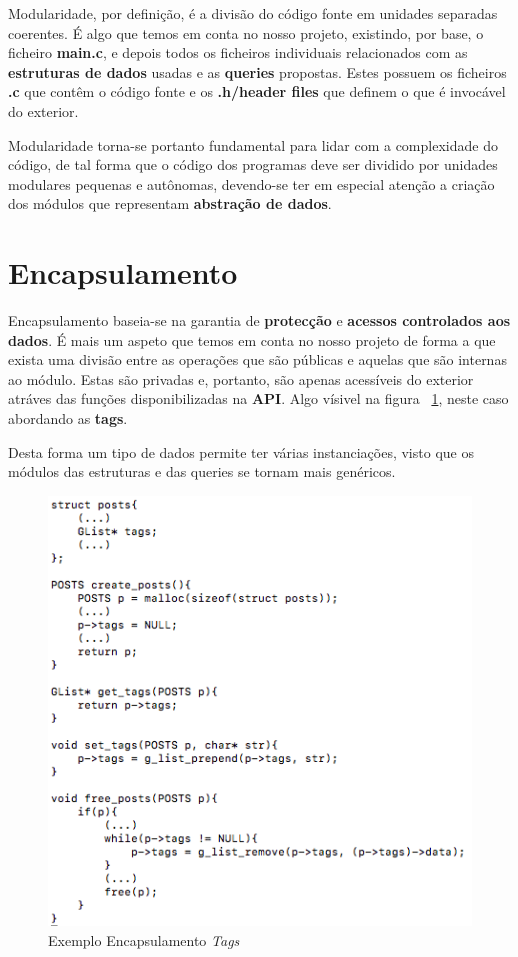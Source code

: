 \documentclass[a4paper]{article}
\begin{document}
Modularidade, por definição, é a divisão do código fonte em unidades 
separadas coerentes. É algo que temos em conta no nosso projeto,
existindo, por base, o ficheiro \textbf{main.c}, e depois todos os
ficheiros individuais relacionados com as \textbf{estruturas de dados}
usadas e as \textbf{queries} propostas. Estes possuem os ficheiros 
\textbf{.c} que contêm o código fonte e os \textbf{.h/header files} que
definem o que é invocável do exterior.

Modularidade torna-se portanto fundamental para lidar com a complexidade
do código, de tal forma que o código dos programas deve ser dividido por
unidades modulares pequenas e autônomas, devendo-se ter em especial atenção
a criação dos módulos que representam \textbf{abstração de dados}.

\section{Encapsulamento}
\label{sec:encapsulamento}

Encapsulamento baseia-se na garantia de \textbf{protecção} e 
\textbf{acessos controlados aos dados}. É mais um aspeto que temos em 
conta no nosso projeto de forma a que exista uma divisão entre as operações 
que são públicas e aquelas que são internas ao módulo. Estas são privadas e,
portanto, são apenas acessíveis do exterior atráves das funções
disponibilizadas na \textbf{API}. Algo vísivel na figura 
~\ref{img:encapsulamento_posts}, neste caso abordando as \textbf{tags}.

Desta forma um tipo de dados permite ter várias instanciações,
visto que os módulos das estruturas e das queries se tornam mais genéricos.

\begin{figure}[H]
\centering
\includegraphics[scale=0.60]{image_exemplo_encapsulamento}
\caption{Exemplo Encapsulamento \textit{Tags}}
\label{img:encapsulamento_posts}
\end{figure}
\end{document}
